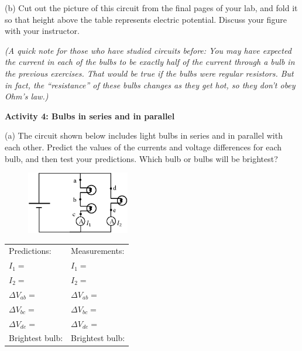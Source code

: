 (b)  Cut out the picture of this circuit from the final pages of your lab, and fold it so that height above the table represents electric potential.  Discuss your figure with your instructor. 

\textit{(A quick note for those who have studied circuits before:  You may have expected the current in each of the bulbs to be exactly half of the current through a bulb in the previous exercises.  That would be true if the bulbs were regular resistors.  But in fact, the ``resistance'' of these bulbs changes as they get hot, so they don't obey Ohm's law.)}

\textbf{Activity 4: Bulbs in series and in parallel} \par
\nopagebreak
(a) The circuit shown below includes light bulbs in series and in parallel with each other.  Predict the values of the currents and voltage differences for each bulb, and then test your predictions.  Which bulb or bulbs will be brightest? \par

\begin{figure}
    \vspace{-1.0 in}
    \includegraphics[width=0.4\textwidth]{electric_circuits/circ_diag5.eps}
\end{figure}

\vspace{0.1 in}
\renewcommand{\arraystretch}{1.6}
\hspace*{0.5in}
\begin{tabular}{l l}
Predictions: \hspace{0.7in} & Measurements: \\
$I_1 =$ & $I_1 =$ \\
$I_2 =$ & $I_2 =$ \\
$\Delta V_{ab} =$ & $\Delta V_{ab} =$ \\
$\Delta V_{bc} =$ & $\Delta V_{bc} =$ \\
$\Delta V_{de} =$ & $\Delta V_{de} =$ \\
Brightest bulb: & Brightest bulb: \\
\end{tabular}
\renewcommand{\arraystretch}{1.0}
\vspace{0.3in}

